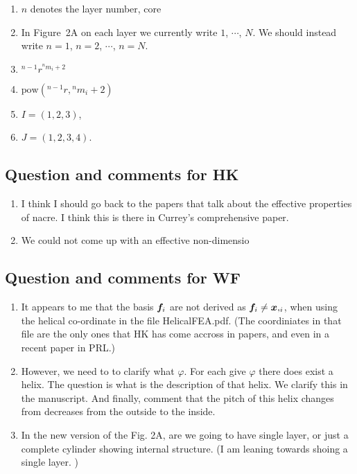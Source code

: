 \documentclass[10pt,times]{article}
\begin{document}
\begin{enumerate}
    \item $n$ denotes the layer number, core
    \item In Figure~2A on each layer we currently write  $1$, $\cdots$, $N$. We should instead write $n=1$, $n=2$,  $\cdots$, $n=N$. 
    \item $^{n-1}\!{r}^{{}^{n}\!{m_{i}}+2}$
    \item $\text{pow}(^{n-1}\!{r},{{}^{n}\!{m_{i}}+2})$
    \item $I=(1,2,3)$, 
    \item $J=(1,2,3,4)$. 
\end{enumerate}

\subsection{Question and comments for HK}
\begin{enumerate}
    \item I think I should go back to the papers that talk about the effective properties of nacre. I think this is there in Currey's comprehensive paper.
    \item We could not come up with an effective non-dimensio
\end{enumerate}

\subsection{Question and comments for WF}
\begin{enumerate}
    \item It appears to me that the basis $\boldsymbol{f}_i$ are not derived as $\boldsymbol{f}_i \neq \boldsymbol{x},_{i} $, when using the helical co-ordinate in the file HelicalFEA.pdf. (The coordiniates in that file are the only ones that HK has come accross in papers, and even in a recent paper in PRL.)
    \item However, we need to to clarify what $\varphi$. For each give $\varphi$ there does exist a helix. The question is what is the description of that helix. We clarify this in the manuscript. And finally, comment that the pitch of this helix changes from decreases from the outside to the inside.
    \item In the new version of the Fig. 2A, are we going to have single layer, or just a complete cylinder showing internal structure. (I am leaning towards shoing a single layer. ) 
\end{enumerate}
\end{document}

